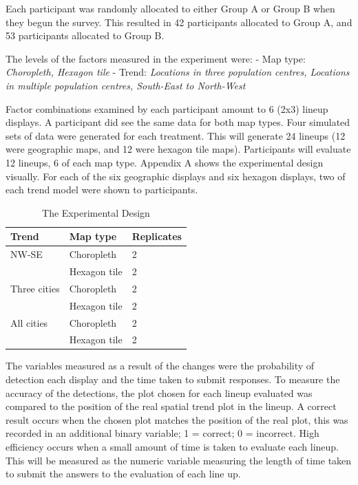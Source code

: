 \documentclass[conference,final,]{IEEEtran}
\begin{document}
Each participant was randomly allocated to either Group A or Group B
when they begun the survey. This resulted in 42 participants allocated
to Group A, and 53 participants allocated to Group B.

The levels of the factors measured in the experiment were: - Map type:
\emph{Choropleth, Hexagon tile} - Trend: \emph{Locations in three
population centres, Locations in multiple population centres, South-East
to North-West}

Factor combinations examined by each participant amount to 6 (2x3)
lineup displays. A participant did see the same data for both map types.
Four simulated sets of data were generated for each treatment. This will
generate 24 lineups (12 were geographic maps, and 12 were hexagon tile
maps). Participants will evaluate 12 lineups, 6 of each map type.
Appendix A shows the experimental design visually. For each of the six
geographic displays and six hexagon displays, two of each trend model
were shown to participants.

\begin{table}[]
\caption{The Experimental Design}
\label{tab:my-table}
\begin{tabular}{|l|l|l|}
\hline
Trend & Map type & Replicates \\ \hline
NW-SE & Choropleth & 2 \\ \hline
 & Hexagon tile & 2 \\ \hline
Three cities & Choropleth & 2 \\ \hline
 & Hexagon tile & 2 \\ \hline
All cities & Choropleth & 2 \\ \hline
 & Hexagon tile & 2 \\ \hline
\end{tabular}
\end{table}

The variables measured as a result of the changes were the probability
of detection each display and the time taken to submit responses. To
measure the accuracy of the detections, the plot chosen for each lineup
evaluated was compared to the position of the real spatial trend plot in
the lineup. A correct result occurs when the chosen plot matches the
position of the real plot, this was recorded in an additional binary
variable; 1 = correct; 0 = incorrect. High efficiency occurs when a
small amount of time is taken to evaluate each lineup. This will be
measured as the numeric variable measuring the length of time taken to
submit the answers to the evaluation of each line up.
\end{document}
